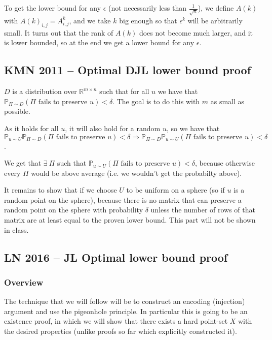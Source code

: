 \documentclass[11pt]{article}
\newcommand{\R}{\mathbb{R}}
\newcommand{\Prob}{\mathbb{P}}
\begin{document}
  To get the lower bound for any $\epsilon$ (not necessarily less than $\frac{1}{\sqrt{n}}$), we define $A(k)$ with $A(k)_{i,j}=A_{i,j}^k$, and we take $k$ big enough so that $\epsilon^k$ will be arbitrarily small. It turns out that the rank of $A(k)$ does not become much larger, and it is lower bounded, so at the end we get a lower bound for any $\epsilon$.

\subsection{KMN 2011 -- Optimal DJL lower bound proof \cite{KMN11}}

$D$ is a distribution over $\R^{m\times n}$ such that for all $u$ we have that  $\Prob_{\Pi \sim D} (\Pi \text{ fails to preserve }u) <\delta$. The goal is to do this with $m$ as small as possible.

As it holds for all $u$, it will also hold for a random $u$, so we have that $\Prob_{u \sim U} \Prob_{\Pi \sim D} (\Pi\text{ fails to preserve }u) < \delta \Rightarrow \Prob_{\Pi \sim D} \Prob_{u \sim U}(\Pi\text{ fails to preserve }u)<\delta$.

We get that $\exists\ \Pi$ such that $\Prob_{u \sim U} (\Pi\text{ fails to preserve }u)<\delta$, because otherwise every $\Pi$ would be above average (i.e. we wouldn't get the probabilty above).

It remains to show that if we choose $U$ to be uniform on a sphere (so if $u$ is a random point on the sphere), because there is no matrix that can preserve a random point on the sphere with probability $\delta$ unless the number of rows of that matrix are at least equal to the proven lower bound. This part will not be shown in class.

\subsection{LN 2016 -- JL Optimal lower bound proof \cite{LN16}}

\subsubsection{Overview}
The technique that we will follow will be to construct an encoding (injection) argument and use the pigeonhole principle. In particular this is going to be an existence proof, in which we will show that there exists a hard point-set $X$ with the desired properties (unlike proofs so far which explicitly constructed it).
\end{document}
